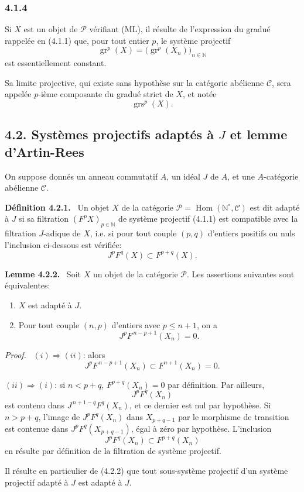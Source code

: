 \documentclass[11pt]{article}
\newenvironment{statement}[1]{\par\medskip\noindent\textbf{#1.}\ }{\par\medskip}
\newenvironment{prooftext}[1][Proof]{\par\noindent\emph{#1.}\ }{\par\medskip}
\DeclareMathOperator{\Hom}{Hom}
\providecommand{\gr}{\operatorname{gr}}
\providecommand{\Hom}{\operatorname{Hom}}
\providecommand{\gr}{\operatorname{gr}}
\providecommand{\gr}{\operatorname{gr}}
\providecommand{\grs}{\operatorname{grs}}
\begin{document}
\subsubsection*{4.1.4}
Si $X$ est un objet de \(\mathcal P\) vérifiant (ML), il résulte de l'expression du gradué rappelée en (4.1.1) que, pour tout entier \(p\), le système projectif
\[
\gr^p(X)=\bigl(\gr^p(X_n)\bigr)_{n\in\mathbb N}
\]
est essentiellement constant.

Sa limite projective, qui existe sans hypothèse sur la catégorie abélienne \(\mathcal C\), sera appelée \(p\)-ième composante du gradué strict de \(X\), et notée
\[
\grs^p(X).
\]

\subsection*{4.2. Systèmes projectifs adaptés à \(J\) et lemme d'Artin-Rees}

On suppose donnés un anneau commutatif \(A\), un idéal \(J\) de \(A\), et une \(A\)-catégorie abélienne \(\mathcal C\).

\begin{statement}{Définition 4.2.1}
Un objet \(X\) de la catégorie \(\mathcal P=\Hom(\mathbb N^\circ,\mathcal C)\) est dit adapté à \(J\) si sa filtration \((F^pX)_{p\in\mathbb N}\) de système projectif (4.1.1) est compatible avec la filtration \(J\)-adique de \(X\), i.e. si pour tout couple \((p,q)\) d'entiers positifs ou nuls l'inclusion ci-dessous est vérifiée:
\[
J^pF^q(X)\subset F^{p+q}(X).
\]
\end{statement}

\begin{statement}{Lemme 4.2.2}
Soit \(X\) un objet de la catégorie \(\mathcal P\). Les assertions suivantes sont équivalentes:
\begin{enumerate}[label=\textup{(\roman*)}]
\item \(X\) est adapté à \(J\).
\item Pour tout couple \((n,p)\) d'entiers avec \(p\le n+1\), on a
\[
J^pF^{\,n-p+1}(X_n)=0 .
\]
\end{enumerate}
\end{statement}

\begin{prooftext}
\((i)\Rightarrow(ii)\): alors
\[
J^pF^{\,n-p+1}(X_n)\subset F^{n+1}(X_n)=0.
\]

\((ii)\Rightarrow(i)\): si \(n<p+q\), \(F^{p+q}(X_n)=0\) par définition. Par ailleurs,
\[
J^pF^q(X_n)
\]
est contenu dans \(J^{\,n+1-q}F^q(X_n)\), et ce dernier est nul par hypothèse. Si \(n>p+q\), l'image de \(J^pF^q(X_n)\) dans \(X_{p+q-1}\) par le morphisme de transition est contenue dans \(J^pF^q(X_{p+q-1})\), égal à zéro par hypothèse. L'inclusion
\[
J^pF^q(X_n)\subset F^{p+q}(X_n)
\]
en résulte par définition de la filtration de système projectif.

Il résulte en particulier de (4.2.2) que tout sous-système projectif d'un système projectif adapté à \(J\) est adapté à \(J\).
\end{prooftext}
\end{document}
